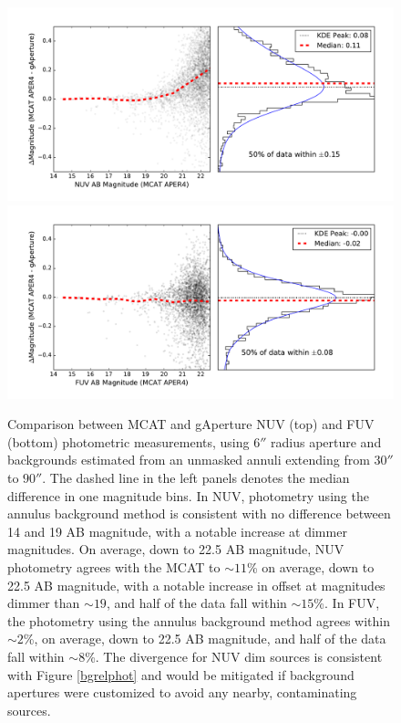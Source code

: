 \documentclass[preprint]{aastex}
\begin{document}
\clearpage
\begin{figure}[t!]
\includegraphics[scale=0.6]{Fig04a.pdf}\\
\includegraphics[scale=0.6]{Fig04b.pdf}
\caption{Comparison between MCAT and gAperture NUV (top) and FUV (bottom) photometric measurements, using $6''$ radius aperture and backgrounds estimated from an unmasked annuli extending from $30''$ to $90''$. The dashed line in the left panels denotes the median difference in one magnitude bins. In NUV, photometry using the annulus background method is consistent with no difference between 14 and  19 AB magnitude, with a notable increase at dimmer magnitudes. On average, down to 22.5 AB magnitude, NUV photometry agrees with the MCAT to $\sim 11$\% on average, down to 22.5 AB magnitude, with a notable increase in offset at magnitudes dimmer than $\sim19$, and half of the data fall within $\sim 15$\%. In FUV, the photometry using the annulus background method agrees within $\sim 2$\%, on average, down to 22.5 AB magnitude, and half of the data fall within $\sim 8$\%. The divergence for NUV dim sources is consistent with Figure \ref{bgrelphot} and would be mitigated if background apertures were customized to avoid any nearby, contaminating sources.
\label{annulusrelphot}}
\end{figure}
\clearpage
\end{document}
